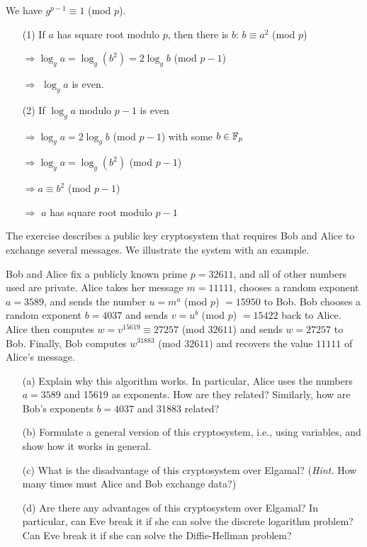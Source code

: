 We have $g^{p-1} \equiv 1$ (mod $p$).

\begin{enumerate}
    \item [(1)] If $a$ has square root modulo $p$, then there is $b$: $b \equiv a^2$ (mod $p$)
    
    $\Rightarrow \log_ga = \log_g(b^2) = 2\log_gb$ (mod $p-1$)
    
    $\Rightarrow$ $\log_ga$ is even. 
    
    \item [(2)] If $\log_ga$ modulo $p-1$ is even
    
    $\Rightarrow \log_ga = 2\log_gb$ (mod $p-1$) with some $b \in \mathbb{F}_p$
    
    $\Rightarrow \log_ga = \log_g(b^2)$ (mod $p-1$)
    
    $\Rightarrow a \equiv b^2$ (mod $p-1$)
    
    $\Rightarrow$ $a$ has square root modulo $p-1$
\end{enumerate}

\begin{exer}[2.10]
The exercise describes a public key cryptosystem that requires Bob and Alice to exchange several messages. We illustrate the system with an example.

Bob and Alice fix a publicly known prime $p=32611$, and all of other numbers used are private. Alice takes her message $m=11111$, chooses a random exponent $a=3589$, and sends the number $u=m^a$ (mod $p$) $=15950$ to Bob. Bob chooses a random exponent $b=4037$ and sends $v=u^b$ (mod $p$) $=15422$ back to Alice. Alice then computes $w=v^{15619} \equiv 27257$ (mod $32611$) and sends $w=27257$ to Bob. Finally, Bob computes $w^{31883}$ (mod $32611$) and recovers the value $11111$ of Alice's message.

\begin{enumerate}
    \item [(a)] Explain why this algorithm works. In particular, Alice uses the numbers $a=3589$ and 15619 as exponents. How are they related? Similarly, how are Bob's exponents $b=4037$ and 31883 related?
    \item [(b)] Formulate a general version of this cryptosystem, i.e., using variables, and show how it works in general.
    \item [(c)] What is the disadvantage of this cryptosystem over Elgamal? (\textit{Hint.} How many times must Alice and Bob exchange data?)
    \item [(d)] Are there any advantages of this cryptosystem over Elgamal? In particular, can Eve break it if she can solve the discrete logarithm problem? Can Eve break it if she can solve the Diffie-Hellman problem?
\end{enumerate}
\end{exer}

